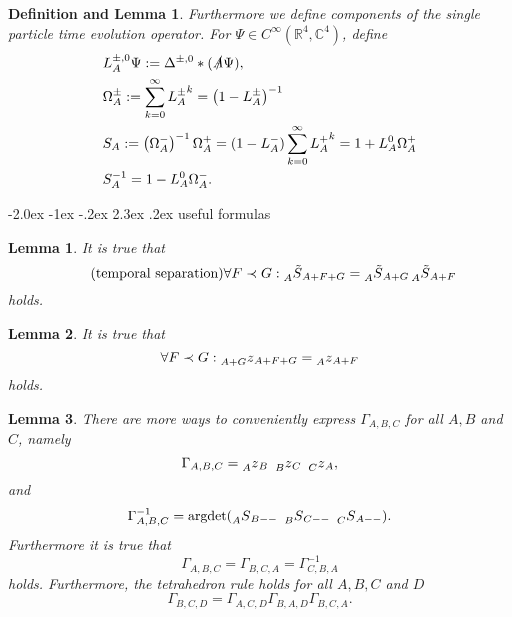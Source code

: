 \documentclass[oneside,reqno,12pt]{amsart}
\makeatletter
\newtheorem{DefLem}{Definition and Lemma}[section]
\newtheorem{lemma}{Lemma}
\renewcommand\section{\@startsection {section}{1}{\z@}%
                                   {-2.0ex \@plus -1ex \@minus -.2ex}%
                                   {2.3ex \@plus.2ex}%
                                   {\normalfont\Large\bfseries}}
\makeatother
\begin{document}
\begin{DefLem}\label{Def:LOperator}
Furthermore we define components of the single particle time evolution operator. For \(\Psi \in C^\infty\left(\mathbb{R}^4, \mathbb{C}^4\right)\), define
\begin{align}
&L^{\pm,0}_A \Psi:= \Delta^{\pm, 0} \ast (\slashed{A} \Psi),\\
&\Omega^{\pm}_A:= \sum_{k=0}^\infty {L^{\pm}_A}^k=\left( 1 - L_A^{\pm}\right)^{-1}\\
&S_A := \left( \Omega_A^-\right)^{-1} \Omega_A^+ = (1-L_A^{-}) \sum_{k=0}^\infty {L^{+}_A}^k = 1+ L_A^0 \Omega^+_A\\
&S_A^{-1} = 1- L^0_A \Omega^-_A.
\end{align}
\end{DefLem}



\section{useful formulas}



\begin{lemma}\label{lemma:temp_sep}
It is true that
\begin{equation}\label{temp_sep}\tag{temporal separation}
\forall F\prec G: \prescript{}{A}{\tilde{S}}_{A+F+G}=\prescript{}{A}{\tilde{S}}_{A+G}\prescript{}{A}{\tilde{S}}_{A+F}
\end{equation}
holds.
\end{lemma}

\begin{lemma}\label{lemma:z_temp_sep}
It is true that
\begin{equation}\label{z_temp_sep}
\forall F\prec G: \prescript{}{A+G}{z}_{A+F+G}=\prescript{}{A}{z}_{A+F}
\end{equation}
holds.
\end{lemma}

\begin{lemma}\label{lemma:gamma}
There are more ways to conveniently express \(\Gamma_{A,B,C}\) for all \(A,B\) and \(C\), namely
\begin{equation}\label{gamma_to_z}
\Gamma_{A,B,C}=\prescript{}{A}{z}_{B} ~\prescript{}{B}{z}_{C}~\prescript{}{C}{z}_A,
\end{equation}
and
\begin{equation}\label{gamma_by_argdet}
\Gamma^{-1}_{A,B,C}= \text{argdet}(\prescript{}{A}{S}_{B --} ~ \prescript{}{B}{S}_{C --} ~\prescript{}{C}{S}_{A --}).
\end{equation}
Furthermore it is true that
\begin{equation}\label{gamma_cycle}
\Gamma_{A,B,C}=\Gamma_{B,C,A}=\Gamma^{-1}_{C,B,A}
\end{equation}
holds. Furthermore, the tetrahedron rule holds for all \(A,B,C\) and \(D\)
\begin{equation}\label{gamma_tetrahedron}
\Gamma_{B,C,D}=\Gamma_{A,C,D}\Gamma_{B,A,D} \Gamma_{B,C,A}.
\end{equation}

\end{lemma}
\end{document}

